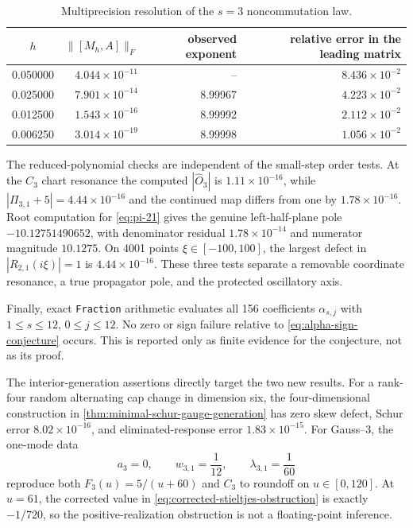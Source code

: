 \documentclass[11pt,a4paper]{article}
\begin{document}
\begin{table}[H]
\centering
\caption{Multiprecision resolution of the \(s=3\) noncommutation law.}
\label{tab:decimal-noncommutation}
\begin{tabular}{@{}crrr@{}}
\toprule
\(h\) & \(\|[M_h,A]\|_F\) & observed exponent
& relative error in the leading matrix \\ \midrule
0.050000 & \(4.044\times10^{-11}\) & -- & \(8.436\times10^{-2}\)\\
0.025000 & \(7.901\times10^{-14}\) & 8.99967 & \(4.223\times10^{-2}\)\\
0.012500 & \(1.543\times10^{-16}\) & 8.99992 & \(2.112\times10^{-2}\)\\
0.006250 & \(3.014\times10^{-19}\) & 8.99998 & \(1.056\times10^{-2}\)\\
\bottomrule
\end{tabular}
\end{table}

The reduced-polynomial checks are independent of the small-step order
tests.  At the \(C_3\) chart resonance the computed
\(|\widehat O_3|\) is \(1.11\times10^{-16}\), while
\(|\Pi_{3,1}+5|=4.44\times10^{-16}\) and the continued map differs from
one by \(1.78\times10^{-16}\).  Root computation for
\cref{eq:pi-21} gives the genuine left-half-plane pole
\(-10.12751490652\), with denominator residual
\(1.78\times10^{-14}\) and numerator magnitude \(10.1275\).  On 4001
points \(\xi\in[-100,100]\), the largest defect in
\(|R_{2,1}(i\xi)|=1\) is \(4.44\times10^{-16}\).  These three tests
separate a removable coordinate resonance, a true propagator pole, and
the protected oscillatory axis.

Finally, exact \texttt{Fraction} arithmetic evaluates all 156 coefficients
\(\alpha_{s,j}\) with \(1\le s\le12\), \(0\le j\le12\).  No zero or sign
failure relative to \cref{eq:alpha-sign-conjecture} occurs.  This is
reported only as finite evidence for the conjecture, not as its proof.

The interior-generation assertions directly target the two new results.
For a rank-four random alternating cap change in dimension six, the
four-dimensional construction in
\cref{thm:minimal-schur-gauge-generation} has zero skew defect, Schur
error \(8.02\times10^{-16}\), and eliminated-response error
\(1.83\times10^{-15}\).  For Gauss--3, the one-mode data
\[
 a_3=0,\qquad w_{3,1}=\frac1{12},\qquad
 \lambda_{3,1}=\frac1{60}
\]
reproduce both \(F_3(u)=5/(u+60)\) and \(C_3\) to roundoff on
\(u\in[0,120]\).  At \(u=61\), the corrected value in
\cref{eq:corrected-stieltjes-obstruction} is exactly \(-1/720\), so the
positive-realization obstruction is not a floating-point inference.
\end{document}
